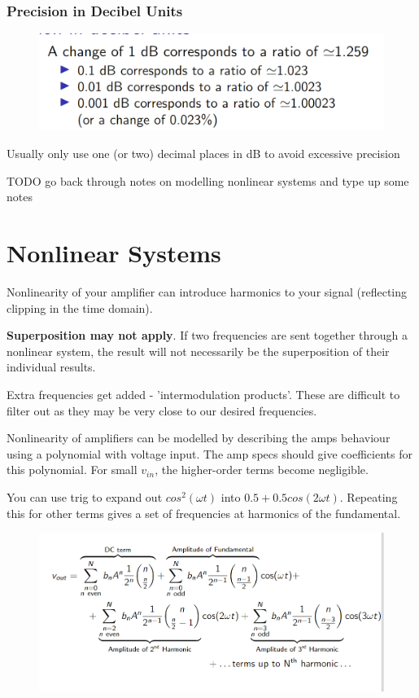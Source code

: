 \documentclass[12pt]{article}
\begin{document}
\subsubsection{Precision in Decibel Units}
\begin{figure}[h!]
    \centering
    \includegraphics[width=0.5\linewidth]{images/image7.png}
\end{figure}
Usually only use one (or two) decimal places in dB to avoid excessive precision

\begin{flushright}[Lecture on 3.2]\end{flushright}
TODO go back through notes on modelling nonlinear systems and type up some notes

\begin{flushright}[Lecture on 3.3]\end{flushright}

\section{Nonlinear Systems}

Nonlinearity of your amplifier can introduce harmonics to your signal (reflecting clipping in the time domain).

\textbf{Superposition may not apply}. If two frequencies are sent together through a nonlinear system, the result will not necessarily be the superposition of their individual results.

Extra frequencies get added - 'intermodulation products'. These are difficult to filter out as they may be very close to our desired frequencies.

Nonlinearity of amplifiers can be modelled by describing the amps behaviour using a polynomial with voltage input. The amp specs should give coefficients for this polynomial.
For small $v_{in}$, the higher-order terms become negligible.

You can use trig to expand out $cos^2(\omega t)$ into $0.5+0.5cos(2\omega t)$. Repeating this for other terms gives a set of frequencies at harmonics of the fundamental.

\begin{figure}[h!]
    \centering
    \includegraphics[width=0.5\linewidth]{images/image8.png}
\end{figure}
\end{document}
